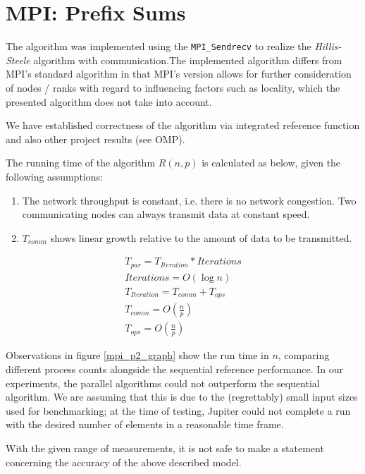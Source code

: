 \documentclass[12pt]{article}
\begin{document}
\newpage
\section{MPI: Prefix Sums}
The algorithm was implemented using the \verb=MPI_Sendrecv= to realize the \emph{Hillis-Steele} algorithm with communication.The implemented algorithm differs from MPI's standard algorithm in that MPI's version allows for further consideration of nodes / ranks with regard to influencing factors such as locality, which the presented algorithm does not take into account.

We have established correctness of the algorithm via integrated reference function and also other project results (see OMP).

The running time of the algorithm $R(n, p)$ is calculated as below, given the following assumptions:
\begin{enumerate}
\item The network throughput is constant, i.e. there is no network congestion. Two communicating nodes can always transmit data at constant speed.
\item $T_{comm}$ shows linear growth relative to the amount of data to be transmitted.
\end{enumerate}

\begin{eqnarray}
T_{par} = T_{Iteration} * Iterations\\
Iterations = O(\log n)\\
T_{Iteration} = T_{comm} + T_{ops}\\
T_{comm} = O\left(\frac{n}{p}\right)\\
T_{ops} = O\left(\frac{n}{p}\right)
\end{eqnarray}

Observations in figure \ref{mpi_p2_graph} show the run time in $n$, comparing different process counts alongside the sequential reference performance. In our experiments, the parallel algorithms could not outperform the sequential algorithm. We are assuming that this is due to the (regrettably) small input sizes used for benchmarking; at the time of testing, Jupiter could not complete a run with the desired number of elements in a reasonable time frame.

With the given range of measurements, it is not safe to make a statement concerning the accuracy of the above described model.
\end{document}
